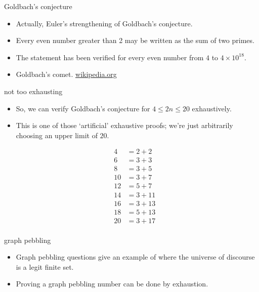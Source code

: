 \documentclass[landscape]{beamer}
\begin{document}
\begin{frame}{Goldbach's conjecture}
\begin{itemize}
\item Actually, Euler's strengthening of Goldbach's conjecture. \pause
\item Every even number greater than 2 may be written as the sum of two primes. \pause
\item The statement has been verified for every even number from $4$ to $4 \times 10^{18}$. \pause
\item Goldbach's comet. \href{https://en.wikipedia.org/wiki/Goldbach's_comet}{wikipedia.org}
\end{itemize}
\end{frame}

\begin{frame}{not too exhausting}
\begin{itemize}
\item So, we can verify Goldbach's conjecture for $4 \leq 2n \leq 20$ exhaustively. \pause
\item This is one of those `artificial' exhaustive proofs; we're just arbitrarily choosing an upper limit of $20$. \pause

\begin{align*}
 4  & =  2+2 &  \\
 6  & =  3+3 & \\
 8  & =  3+5 & \\
 10  & = 3+7 & \\
 12 & =  5+7 & \\
 14  & = 3+11 & \\
 16  & = 3+13 & \\
 18  & = 5+13 & \\
 20 & =  3+17 &  \\
\end{align*}

\end{itemize}
\end{frame}

\begin{frame}{graph pebbling}
\begin{itemize}
\item Graph pebbling questions give an example of where the universe of discourse is a legit finite set. \pause
\item Proving a graph pebbling number can be done by exhaustion. \pause
\end{itemize}
\end{frame}
\end{document}
